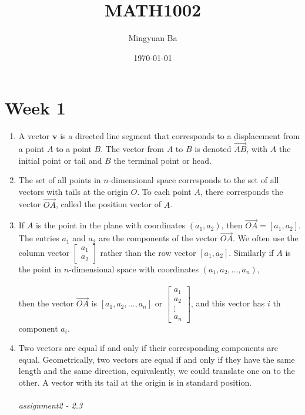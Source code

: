 \documentclass[10pt]{article}
\title{MATH1002}
\author{Mingyuan Ba}
\date{\today}
\begin{document}
\maketitle

\section{Week 1}

\begin{enumerate}
\item  $\mathrm{A}$ vector $\mathbf{v}$ is a directed line segment that corresponds to a displacement from a point $A$ to a point $B$. The vector from $A$ to $B$ is denoted $\overrightarrow{A B}$, with $A$ the initial point or tail and $B$ the terminal point or head.

\item  The set of all points in $n$-dimensional space corresponds to the set of all vectors with tails at the origin $O$. To each point $A$, there corresponds the vector $\overrightarrow{O A}$, called the position vector of $A$.

\item  If $A$ is the point in the plane with coordinates $\left(a_{1}, a_{2}\right)$, then $\overrightarrow{O A}=\left[a_{1}, a_{2}\right]$. The entries $a_{1}$ and $a_{2}$ are the components of the vector $\overrightarrow{O A}$. We often use the column vector $\left[\begin{array}{l}a_{1} \\ a_{2}\end{array}\right]$ rather than the row vector $\left[a_{1}, a_{2}\right]$. Similarly if $A$ is the point in $n$-dimensional space with coordinates $\left(a_{1}, a_{2}, \ldots, a_{n}\right)$, \\\\
then the vector $\overrightarrow{O A}$ is $\left[a_{1}, a_{2}, \ldots, a_{n}\right]$ or $\left[\begin{array}{c}a_{1} \\ a_{2} \\ \vdots \\ a_{n}\end{array}\right]$, and this vector has $i$ th component $a_{i}$.

 \item  Two vectors are equal if and only if their corresponding components are equal. Geometrically, two vectors are equal if and only if they have the same length and the same direction, equivalently, we could translate one on to the other. A vector with its tail at the origin is in standard position.
\\\\
\textit{assignment2 - 2.3}


\end{enumerate}
\end{document}
